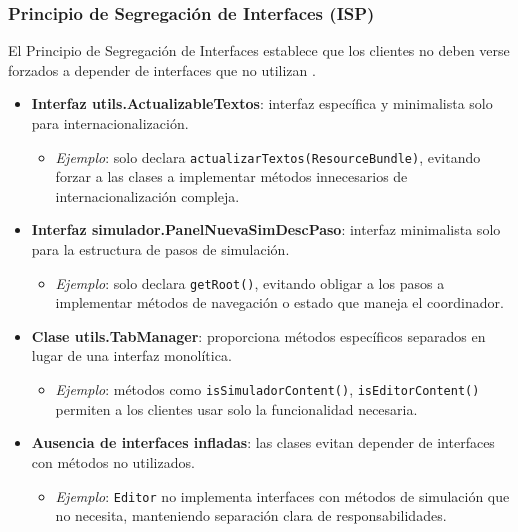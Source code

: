 \subsubsection{Principio de Segregación de Interfaces (ISP)}

El Principio de Segregación de Interfaces establece que los clientes no deben verse forzados a depender de interfaces que no utilizan \cite{martin2003agile, martin2018clean}.

\begin{itemize}
    \item \textbf{Interfaz utils.ActualizableTextos}: interfaz específica y minimalista solo para internacionalización.
    \begin{itemize}
        \item \textit{Ejemplo}: solo declara \texttt{actualizarTextos(ResourceBundle)}, evitando forzar a las clases a implementar métodos innecesarios de internacionalización compleja.
    \end{itemize}

    \item \textbf{Interfaz simulador.PanelNuevaSimDescPaso}: interfaz minimalista solo para la estructura de pasos de simulación.
    \begin{itemize}
        \item \textit{Ejemplo}: solo declara \texttt{getRoot()}, evitando obligar a los pasos a implementar métodos de navegación o estado que maneja el coordinador.
    \end{itemize}

    \item \textbf{Clase utils.TabManager}: proporciona métodos específicos separados en lugar de una interfaz monolítica.
    \begin{itemize}
        \item \textit{Ejemplo}: métodos como \texttt{isSimuladorContent()}, \texttt{isEditorContent()} permiten a los clientes usar solo la funcionalidad necesaria.
    \end{itemize}

    \item \textbf{Ausencia de interfaces infladas}: las clases evitan depender de interfaces con métodos no utilizados.
    \begin{itemize}
        \item \textit{Ejemplo}: \texttt{Editor} no implementa interfaces con métodos de simulación que no necesita, manteniendo separación clara de responsabilidades.
    \end{itemize}
\end{itemize}


